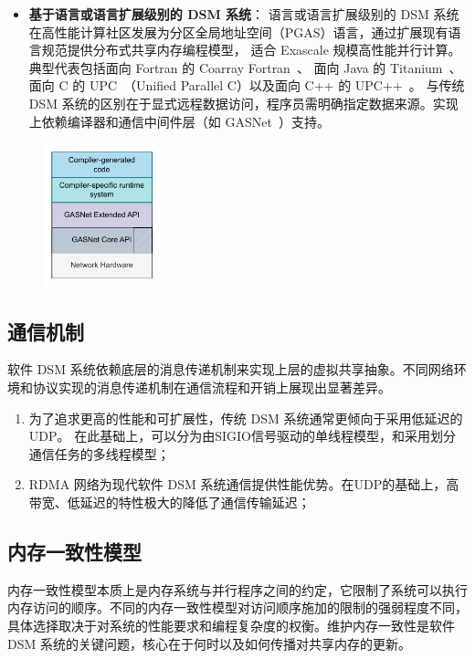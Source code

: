 {\begin{itemize}
        \item \textbf{基于语言或语言扩展级别的 DSM 系统}：
              语言或语言扩展级别的 DSM 系统在高性能计算社区发展为分区全局地址空间（PGAS）语言，通过扩展现有语言规范提供分布式共享内存编程模型，
              适合 Exascale 规模高性能并行计算。典型代表包括面向 Fortran 的 Coarray Fortran~\citep{numrich1998coarrayfortran, coarryfortran2}、
              面向 Java 的 Titanium~\citep{Yelick1998Titanium}、
              面向 C 的 UPC~\citep{bonachea2013UPC}（Unified Parallel C）以及面向 C++ 的 UPC++~\citep{bachan2019upc++}。
              与传统 DSM 系统的区别在于显式远程数据访问，程序员需明确指定数据来源。实现上依赖编译器和通信中间件层（如 GASNet~\citep{Bonachea2018GASNetEX}）支持。
    \end{itemize}

    \begin{figure}
        \centering
        \includegraphics[width=0.3\textwidth]{Img/GASNet.drawio.pdf}
        \label{fig:GASNET}
    \end{figure}

    \subsection{通信机制}
    软件 DSM 系统依赖底层的消息传递机制来实现上层的虚拟共享抽象。不同网络环境和协议实现的消息传递机制在通信流程和开销上展现出显著差异。

    \begin{enumerate}
        \item 为了追求更高的性能和可扩展性，传统 DSM 系统通常更倾向于采用低延迟的 UDP。
              在此基础上，可以分为由SIGIO信号驱动的单线程模型，和采用划分通信任务的多线程模型；
        \item RDMA 网络为现代软件 DSM 系统通信提供性能优势。在UDP的基础上，高带宽、低延迟的特性极大的降低了通信传输延迟；
    \end{enumerate}

    \subsection{内存一致性模型}
    内存一致性模型本质上是内存系统与并行程序之间的约定，它限制了系统可以执行内存访问的顺序。不同的内存一致性模型对访问顺序施加的限制的强弱程度不同，具体选择取决于对系统的性能要求和编程复杂度的权衡。维护内存一致性是软件 DSM 系统的关键问题，核心在于何时以及如何传播对共享内存的更新。

}
